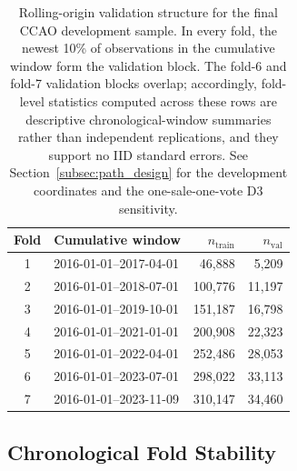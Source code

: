 \documentclass[10pt]{article}
\theoremstyle{definition}
\newcommand{\1}{\mathbf{1}}
\begin{document}
{\begin{table}[!ht]
\centering
\caption{Rolling-origin validation structure for the final CCAO development sample. In every fold, the newest 10\% of observations in the cumulative window form the validation block. The fold-6 and fold-7 validation blocks overlap; accordingly, fold-level statistics computed across these rows are descriptive chronological-window summaries rather than independent replications, and they support no IID standard errors. See Section~\ref{subsec:path_design} for the development coordinates and the one-sale-one-vote D3 sensitivity.}
\label{tab:fold_structure}
\begin{tabular}{clrr}
\toprule
Fold & Cumulative window & $n_{\mathrm{train}}$ & $n_{\mathrm{val}}$ \\
\midrule
1 & 2016-01-01--2017-04-01 & 46,888 & 5,209 \\
2 & 2016-01-01--2018-07-01 & 100,776 & 11,197 \\
3 & 2016-01-01--2019-10-01 & 151,187 & 16,798 \\
4 & 2016-01-01--2021-01-01 & 200,908 & 22,323 \\
5 & 2016-01-01--2022-04-01 & 252,486 & 28,053 \\
6 & 2016-01-01--2023-07-01 & 298,022 & 33,113 \\
7 & 2016-01-01--2023-11-09 & 310,147 & 34,460 \\
\bottomrule
\end{tabular}
\end{table}
}

\subsection{Chronological Fold Stability}
\end{document}

